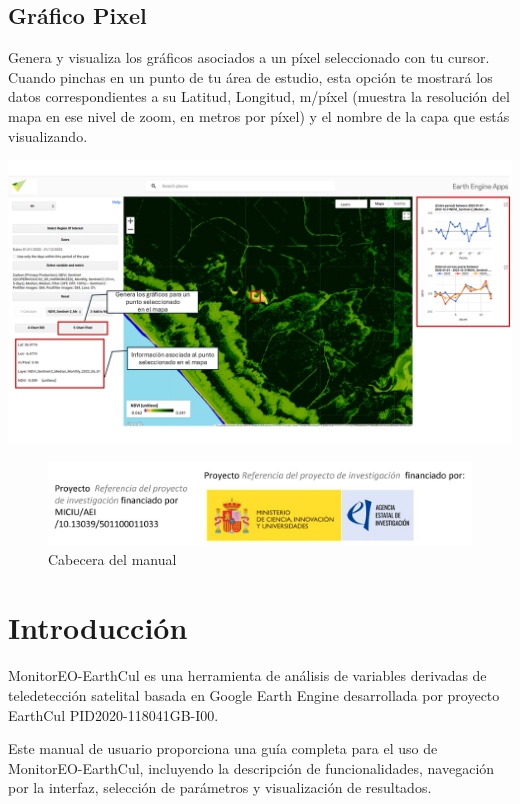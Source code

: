 \documentclass[
]{book}
\begin{document}
\section{\texorpdfstring{\textbf{Gráfico Pixel}}{Gráfico Pixel}}\label{gruxe1fico-pixel}

Genera y visualiza los gráficos asociados a un píxel seleccionado con tu cursor. Cuando pinchas en un punto de tu área de estudio, esta opción te mostrará los datos correspondientes a su Latitud, Longitud, m/píxel (muestra la resolución del mapa en ese nivel de zoom, en metros por píxel) y el nombre de la capa que estás visualizando.

\includegraphics{assets/chart_pixel_es.png}

\begin{figure}
\centering
\includegraphics{assets/logo.jpeg}
\caption{Cabecera del manual}
\end{figure}

\chapter{Introducción}\label{intro}

MonitorEO-EarthCul es una herramienta de análisis de variables derivadas de teledetección satelital basada en Google Earth Engine desarrollada por proyecto EarthCul PID2020-118041GB-I00.

Este manual de usuario proporciona una guía completa para el uso de MonitorEO-EarthCul, incluyendo la descripción de funcionalidades, navegación por la interfaz, selección de parámetros y visualización de resultados.
\end{document}
